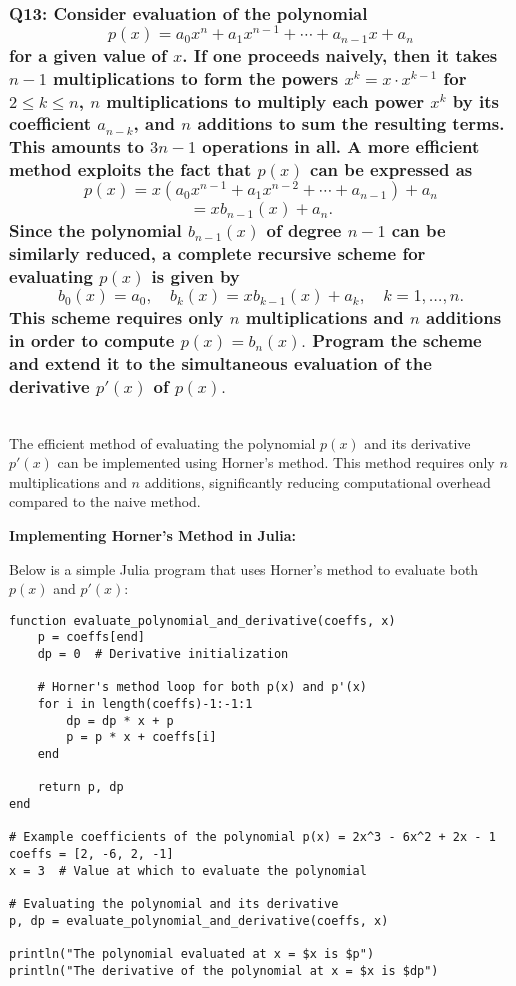 \documentclass{article}
\begin{document}
\subsubsection*{Q13: Consider evaluation of the polynomial
\[ p(x) = a_0x^n + a_1x^{n-1} + \cdots + a_{n-1}x + a_n \]
for a given value of \( x \). If one proceeds naively, then it takes \( n-1 \) multiplications to form the powers \( x^k = x \cdot x^{k-1} \) for \( 2 \leq k \leq n \), \( n \) multiplications to multiply each power \( x^k \) by its coefficient \( a_{n-k} \), and \( n \) additions to sum the resulting terms. This amounts to \( 3n - 1 \) operations in all. A more efficient method exploits the fact that \( p(x) \) can be expressed as 
\[ p(x) = x(a_0x^{n-1} + a_1x^{n-2} + \cdots + a_{n-1}) + a_n \]
\[ = x b_{n-1}(x) + a_n. \]
Since the polynomial \( b_{n-1}(x) \) of degree \( n - 1 \) can be similarly reduced, a complete recursive scheme for evaluating \( p(x) \) is given by 
\[ b_0(x) = a_0, \quad b_k(x) = x b_{k-1}(x) + a_k, \quad k = 1, \ldots, n. \]
This scheme requires only \( n \) multiplications and \( n \) additions in order to compute \( p(x) = b_n(x). \) Program the scheme and extend it to the simultaneous evaluation of the derivative \( p'(x) \) of \( p(x). \)}\\

The efficient method of evaluating the polynomial \(p(x)\) and its derivative \(p'(x)\) can be implemented using Horner's method. This method requires only \(n\) multiplications and \(n\) additions, significantly reducing computational overhead compared to the naive method.

\textbf{Implementing Horner's Method in Julia:}

Below is a simple Julia program that uses Horner's method to evaluate both \(p(x)\) and \(p'(x)\):

\begin{verbatim}
function evaluate_polynomial_and_derivative(coeffs, x)
    p = coeffs[end]
    dp = 0  # Derivative initialization
    
    # Horner's method loop for both p(x) and p'(x)
    for i in length(coeffs)-1:-1:1
        dp = dp * x + p
        p = p * x + coeffs[i]
    end
    
    return p, dp
end

# Example coefficients of the polynomial p(x) = 2x^3 - 6x^2 + 2x - 1
coeffs = [2, -6, 2, -1]
x = 3  # Value at which to evaluate the polynomial

# Evaluating the polynomial and its derivative
p, dp = evaluate_polynomial_and_derivative(coeffs, x)

println("The polynomial evaluated at x = $x is $p")
println("The derivative of the polynomial at x = $x is $dp")
\end{verbatim}
\end{document}
